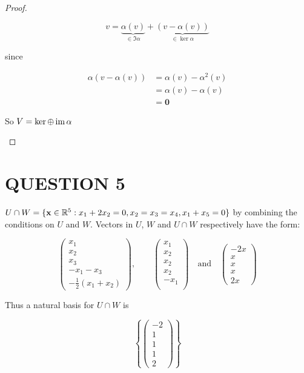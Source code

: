 \documentclass[a4paper]{article}
\begin{document}
\begin{enumerate}
\begin{proof}
\begin{itemize}
		\[ v = \underbrace{\alpha(v)}_{\in \Im \alpha} + \underbrace{(v - \alpha(v))}_{\in \ker \alpha}  \]
		
		since 
		
		\begin{align*}
		\alpha(v-\alpha(v)) & = \alpha(v) - \alpha^{2}(v) \\
		& = \alpha(v) - \alpha(v) \\
		& = \mathbf{0}
		\end{align*}
		
		So $ V = \ker \oplus \operatorname{im} \alpha $
		
	\end{itemize}
\end{proof}
	
\end{enumerate}
 	
 	
	 
	\section{QUESTION 5}
	
	$ U \cap W = \{ \mathbf{x} \in \mathbb{R}^{5} : x_{1} + 2x_{2} =0, x_{2} = x_{3} = x_{4}, x_{1} + x_{5} = 0 \} $ by combining the conditions on $ U $ and $ W $. Vectors in $ U $, $ W $ and $ U \cap W $ respectively have the form:
	
	\[ \begin{pmatrix}
	x_{1} \\
	x_{2} \\
	x_{3} \\
	- x_{1} - x_{3} \\
	- \frac{1}{2} (x_{1} + x_{2})
	\end{pmatrix}, \qquad \begin{pmatrix}
	x_{1} \\
	x_{2} \\
	x_{2} \\
	x_{2} \\
	- x_{1} \\
	\end{pmatrix} 
	\quad \text{and}  \quad 
	\begin{pmatrix}
	-2x \\
	x \\
	x \\
	x \\
	2x
	\end{pmatrix} \]
	
	Thus a natural basis for $ U \cap W $ is 
	
	\[ \left\{  \begin{pmatrix}
	-2 \\
	1 \\
	1 \\
	1 \\
	2
	\end{pmatrix} \right\} \]
	
\end{document}
